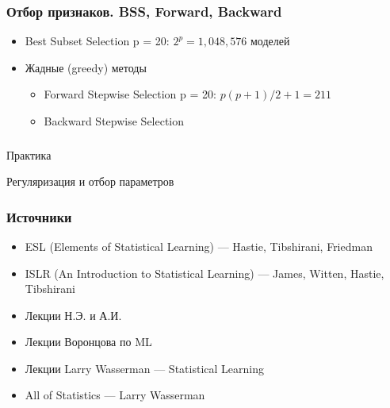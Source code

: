 \documentclass[ucs, notheorems, handout]{beamer}
\begin{document}
\begin{frame}
    \frametitle{Отбор признаков. BSS, Forward, Backward}
\begin{itemize}
	\item Best Subset Selection {\color{gray} p = 20: $2^p = 1,048,576$ моделей}
	\item Жадные (greedy) методы
		\begin{itemize}
		\item Forward Stepwise Selection {\color{gray} p = 20: $p(p+1)/2  + 1 = 211$}
		\item Backward Stepwise Selection
		\end{itemize}
	\end{itemize}
\end{frame}

\begin{frame}
    \frametitle{}

\begin{center}
	\huge {Практика}
	
	\large {Регуляризация и отбор параметров}
\end{center}

    \note{
    
    }
\end{frame}


\begin{frame}
    \frametitle{Источники}
\begin{itemize}
	\item ESL (Elements of Statistical Learning) --- Hastie, Tibshirani, Friedman
	\item ISLR (An Introduction to Statistical Learning) --- James, Witten, Hastie, Tibshirani
	\item Лекции Н.Э. и А.И.
	\item Лекции Воронцова по ML
	\item Лекции Larry Wasserman --- Statistical Learning
	\item All of Statistics --- Larry Wasserman
		\end{itemize}
    \note{
    
    }
\end{frame}
\end{document}
